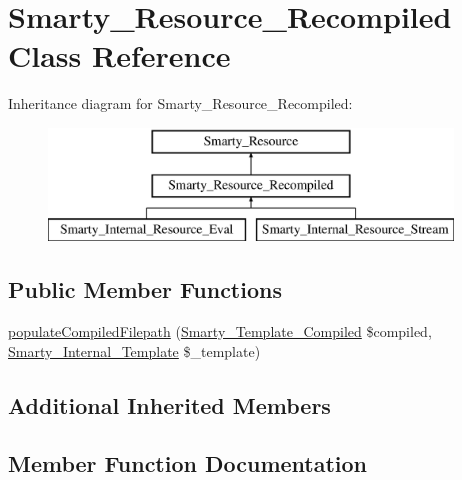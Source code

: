 \hypertarget{class_smarty___resource___recompiled}{}\section{Smarty\+\_\+\+Resource\+\_\+\+Recompiled Class Reference}
\label{class_smarty___resource___recompiled}
Inheritance diagram for Smarty\+\_\+\+Resource\+\_\+\+Recompiled\+:\begin{figure}[H]
\begin{center}
\leavevmode
\includegraphics[height=3.000000cm]{class_smarty___resource___recompiled}
\end{center}
\end{figure}
\subsection*{Public Member Functions}
\begin{DoxyCompactItemize}
\item 
\hyperlink{class_smarty___resource___recompiled_a86942e3e87336b2ffea8a520eeae8428}{populate\+Compiled\+Filepath} (\hyperlink{class_smarty___template___compiled}{Smarty\+\_\+\+Template\+\_\+\+Compiled} \$compiled, \hyperlink{class_smarty___internal___template}{Smarty\+\_\+\+Internal\+\_\+\+Template} \$\+\_\+template)
\end{DoxyCompactItemize}
\subsection*{Additional Inherited Members}


\subsection{Member Function Documentation}
\hypertarget{class_smarty___resource___recompiled_a86942e3e87336b2ffea8a520eeae8428}{}

